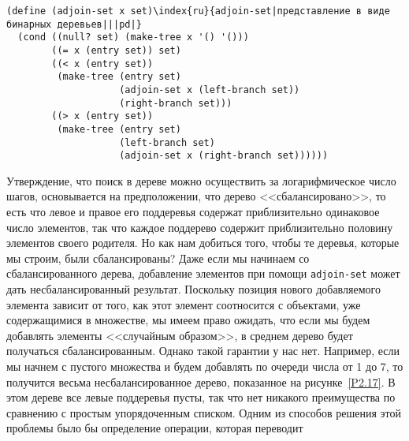 \begin{Verbatim}[fontsize=\small]
(define (adjoin-set x set)\index{ru}{adjoin-set|представление в виде бинарных деревьев|||pd|}
  (cond ((null? set) (make-tree x '() '()))
        ((= x (entry set)) set)
        ((< x (entry set))
         (make-tree (entry set) 
                    (adjoin-set x (left-branch set))
                    (right-branch set)))
        ((> x (entry set))
         (make-tree (entry set)
                    (left-branch set)
                    (adjoin-set x (right-branch set))))))
\end{Verbatim}

Утверждение, что поиск в дереве можно осуществить за
логарифмическое \linebreak
число шагов, основывается на предположении, что дерево 
<<сбалансировано>>, \linebreak
  то есть что левое и правое его поддеревья содержат
приблизительно одинаковое \linebreak
число элементов, так что каждое поддерево
содержит приблизительно \linebreak
половину элементов своего родителя.  Но как
нам добиться того, чтобы те \linebreak
деревья, которые мы строим, были
сбалансированы?  Даже если мы начинаем со \linebreak
сбалансированного дерева,
добавление элементов при помощи {\tt adjoin-set} может дать
несбалансированный результат.  Поскольку позиция нового добавляемого
элемента зависит от того, как этот элемент соотносится с объектами,
уже содержащимися в множестве, мы имеем право ожидать, 
что если мы
будем добавлять элементы <<случайным образом>>, в среднем дерево 
будет 
получаться сбалансированным.  \linebreak
Однако такой гарантии у нас нет.
Например, если мы начнем с пустого \linebreak
 множества и будем добавлять по
очереди числа от 1 до 7, то получится весьма \linebreak
несбалансированное
дерево, показанное на рисунке~\ref{P2.17}.  В этом дереве все \linebreak
левые поддеревья пусты, так что нет никакого преимущества по
сравнению с \linebreak
простым упорядоченным списком.  Одним из способов решения
этой проблемы было бы определение операции, которая переводит
